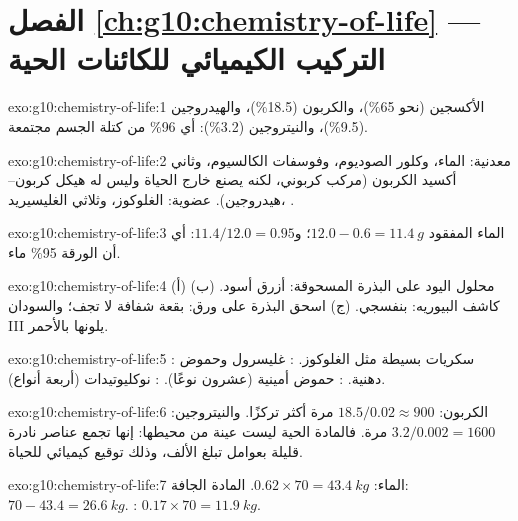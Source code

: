 \section*{الفصل \ref{ch:g10:chemistry-of-life} --- التركيب الكيميائي للكائنات الحية}

\begin{solution}{exo:g10:chemistry-of-life:1}
الأكسجين (نحو 65\%)، والكربون (18.5\%)، والهيدروجين (9.5\%)،
والنيتروجين (3.2\%): أي 96\% من كتلة الجسم مجتمعة.
\end{solution}

\begin{solution}{exo:g10:chemistry-of-life:2}
معدنية: الماء، وكلور الصوديوم، وفوسفات الكالسيوم، وثاني أكسيد الكربون
(مركب كربوني، لكنه يصنع خارج الحياة وليس له هيكل كربون--هيدروجين).
عضوية: الغلوكوز، وثلاثي الغليسيريد، .
\end{solution}

\begin{solution}{exo:g10:chemistry-of-life:3}
الماء المفقود $12.0 - 0.6 = \qty{11.4}{g}$؛ و$11.4/12.0 = 0.95$: أي
أن الورقة 95\% ماء.
\end{solution}

\begin{solution}{exo:g10:chemistry-of-life:4}
(أ) محلول اليود على البذرة المسحوقة: أزرق أسود. (ب) كاشف البيوريه:
بنفسجي. (ج) اسحق البذرة على ورق: بقعة شفافة لا تجف؛ والسودان III
يلونها بالأحمر.
\end{solution}

\begin{solution}{exo:g10:chemistry-of-life:5}
: سكريات بسيطة مثل الغلوكوز. : غليسرول وحموض دهنية.
: حموض أمينية (عشرون نوعًا). : نوكليوتيدات
(أربعة أنواع).
\end{solution}

\begin{solution}{exo:g10:chemistry-of-life:6}
الكربون: $18.5/0.02 \approx 900$ مرة أكثر تركزًا. والنيتروجين:
$3.2/0.002 = 1600$ مرة. فالمادة الحية ليست عينة من محيطها: إنها تجمع
عناصر نادرة قليلة بعوامل تبلغ الألف، وذلك توقيع كيميائي للحياة.
\end{solution}

\begin{solution}{exo:g10:chemistry-of-life:7}
الماء: $0.62 \times 70 = \qty{43.4}{kg}$. المادة الجافة: $70 - 43.4 =
\qty{26.6}{kg}$. : $0.17 \times 70 = \qty{11.9}{kg}$.
\end{solution}

